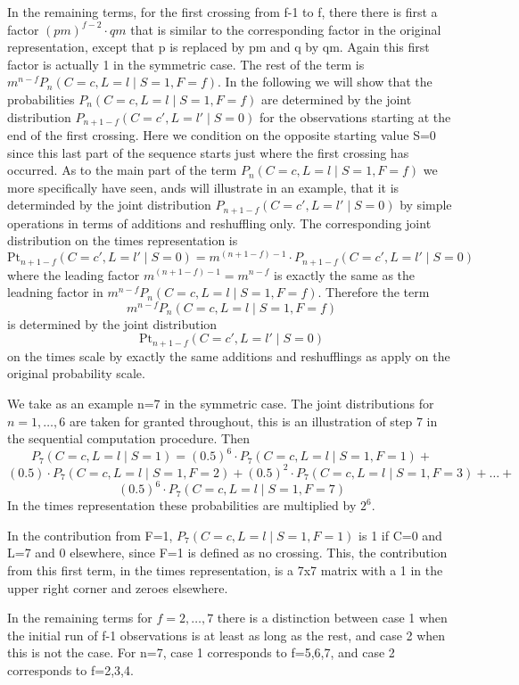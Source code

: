 In the remaining terms, for the first crossing from f-1 to f, there there is first a factor $(pm)^{f-2} \cdot  qm$ that is similar to the corresponding factor in the original representation, except that p is replaced by pm and q by qm. Again this first factor is actually 1 in the symmetric case. The rest of the term is $m^{n-f} P_n ( C=c, L=l \mid S=1, F=f)$. In the following we will show that the probabilities $P_n ( C=c, L=l \mid S=1, F=f)$ are determined by the joint distribution $P_{n+1-f} ( C=c', L=l' \mid S=0)$ for the observations starting at the end of the first crossing. Here we condition on the opposite starting value S=0 since this last part of the sequence starts just where the first crossing has occurred. As to the main part of the term $P_n ( C=c, L=l \mid S=1, F=f)$ we more specifically have seen, ands will illustrate in an example, that it is determinded by the joint distribution $P_{n+1-f} ( C=c', L=l' \mid S=0)$ by simple operations in terms of additions and reshuffling only. The corresponding joint distribution on the times representation is $$\text{Pt}_{n+1-f} ( C=c', L=l' \mid S=0)=m^{(n+1-f)-1} \cdot P_{n+1-f} ( C=c', L=l' \mid S=0)$$ where the leading factor $m^{(n+1-f)-1}=m^{n-f}$ is exactly the same as the leadning factor in $m^{n-f} P_n ( C=c, L=l \mid S=1, F=f)$. Therefore the term $$m^{n-f} P_n ( C=c, L=l \mid S=1, F=f)$$ is determined by the joint distribution $$\text{Pt}_{n+1-f} ( C=c', L=l' \mid S=0)$$ on the times scale by exactly the same additions and reshufflings as apply on the original probability scale.

We take as an example n=7 in the symmetric case. The joint distributions for $n=1, \ldots, 6$ are taken for granted throughout, this is an illustration of step 7 in the sequential computation procedure. Then $$P_7 (C=c, L=l \mid S=1) = (0.5)^6 \cdot   P_7 (C=c, L=l \mid S=1,F=1) +    $$  $$(0.5) \cdot P_7 (C=c, L=l \mid S=1,F=2) + (0.5)^2 \cdot P_7 (C=c, L=l \mid S=1,F=3) + \ldots  +$$ $$(0.5)^6 \cdot P_7 (C=c, L=l \mid S=1,F=7) $$
In the times representation these probabilities are multiplied by $2^6$. 

In the contribution from F=1, $P_7 (C=c, L=l \mid S=1,F=1)$ is 1 if C=0 and L=7 and 0 elsewhere, since F=1 is defined as no crossing. This, the contribution from this first term, in the times representation, is a 7x7 matrix with a 1 in the upper right corner and zeroes elsewhere. 

In the remaining terms for $f=2, \ldots, 7$ there is a distinction between case 1 when the initial run of f-1 observations is at least as long as the rest, and case 2 when this is not the case. For n=7, case 1 corresponds to f=5,6,7, and case 2 corresponds to f=2,3,4. 

